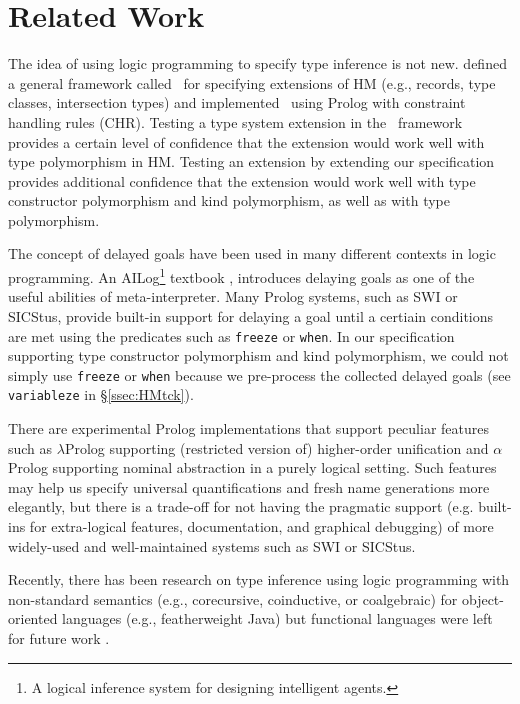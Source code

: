 \section{Related Work}\label{sec:relwork}
The idea of using logic programming to specify type inference is not new.
\citet*{HMX99} defined a general framework called \HMX\ for specifying
extensions of HM (e.g., records, type classes, intersection types)
and \citet{tyinferCHR02} implemented \HMX\ using Prolog with
constraint handling rules (CHR). Testing a type system extension
in the \HMX\ framework provides a certain level of confidence that the extension
would work well with type polymorphism in HM. Testing an extension by
extending our specification provides additional confidence that the extension
would work well with type constructor polymorphism and kind polymorphism,
as well as with type polymorphism.

The concept of delayed goals have been used in many different contexts
in logic programming. An AILog\footnote{A logical inference system for designing
	 intelligent agents.} textbook \cite{AILogTextBook},
introduces delaying goals as one of the useful abilities of meta-interpreter.
Many Prolog systems, such as SWI or SICStus, provide built-in support for
delaying a goal until a certiain conditions are met using the predicates
such as \verb|freeze| or \verb|when|. In our specification supporting
type constructor polymorphism and kind polymorphism, we could not
simply use \verb|freeze| or \verb|when| because we pre-process
the collected delayed goals (see \verb|variableze| in \S\ref{ssec:HMtck}).


There are experimental Prolog implementations that support peculiar features
such as
$\lambda$Prolog \cite{nadathur99cade}
supporting (restricted version of) higher-order unification
and 
$\alpha$Prolog \cite{cheney04iclp}
supporting nominal abstraction in a purely logical setting.
Such features may help us specify universal quantifications and fresh name
generations more elegantly, but there is a trade-off for not having the
pragmatic support (e.g. built-ins for extra-logical features, documentation, and
graphical debugging) of more widely-used and well-maintained systems
such as SWI or SICStus.

Recently, there has been research on type inference using logic programming
with non-standard semantics (e.g., corecursive, coinductive, or coalgebraic)
for object-oriented languages (e.g., featherweight Java) but
functional languages were left for future work \cite{AnconaLZ08}.

